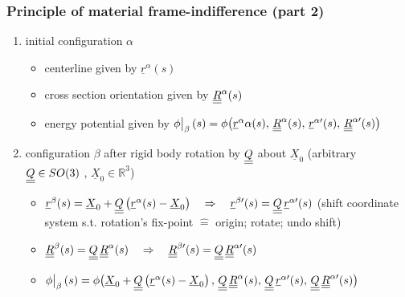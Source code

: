 \begin{frame}
  \frametitle{Principle of material frame-indifference (part 2)}
  \vspace{-0.6em}
  \begin{enumerate}
    \item initial configuration $\alpha$
      \begin{itemize}
        \item centerline given by $\underline{r}^{\alpha}(s)$
        \item cross section orientation given by $\underline{\underline{R}}^{\alpha}(s)$
        \item energy potential given by $\eval[1]{\phi}_{\beta}(s) = \phi \bigl( \underline{r}^{\alpha}{\alpha}(s) , \, \doubleunderline{R}^{\alpha}(s) , \, \underline{r}^{\alpha \prime}(s) , \, \doubleunderline{R}^{\alpha \prime}(s) \bigr)$
      \end{itemize}
      
    \item configuration $\beta$ after rigid body rotation by $\underline{\underline{Q}}$ about $\underline{X}_0$ 
      (arbitrary $\underline{\underline{Q}} \in SO(3)$ , $\underline{X}_0 \in \mathbb{R}^3$)
      \begin{itemize}
        \item $\underline{r}^{\beta}(s) = \underline{X}_0 + \underline{\underline{Q}} \left( \underline{r}^{\alpha}(s) - \underline{X}_0 \right) \quad \Rightarrow \quad \underline{r}^{\beta \prime}(s) = \underline{\underline{Q}} \, \underline{r}^{\alpha \prime}(s)$ \newline
          \null \quad (shift coordinate system s.t. rotation's fix-point $\hat{=}$ origin; rotate; undo shift)
        \item $\underline{\underline{R}}^{\beta}(s) = \underline{\underline{Q}} \, \underline{\underline{R}}^{\alpha}(s) \quad \Rightarrow \quad \underline{\underline{R}}^{\beta \prime}(s) = \underline{\underline{Q}} \, \underline{\underline{R}}^{\alpha \prime}(s)$
        \item $\eval[1]{\phi}_{\beta}(s) = \phi \bigl( \underline{X}_0 + \doubleunderline{Q} \left( \underline{r}^{\alpha}(s) - \underline{X}_0 \right) , \, \doubleunderline{Q} \, \doubleunderline{R}^{\alpha}(s) , \, \doubleunderline{Q} \, \underline{r}^{\alpha \prime}(s) , \, \doubleunderline{Q} \, \doubleunderline{R}^{\alpha \prime}(s) \bigr)$
      \end{itemize}
      

\end{enumerate}
\end{frame}
